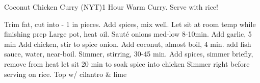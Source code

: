 \documentclass[a6paper,landscape]{article}
\begin{document}
\begin{recipe}{Coconut Chicken Curry        (NYT)}{1 Hour}{}
  \freeform Warm Curry. Serve with rice! 

  Trim fat, cut into  - 1 in pieces. Add spices, mix well. Let sit at room temp while finishing prep
  Large pot, heat oil. Sauté onions med-low 8-10min. Add garlic, 5 min
  Add chicken, stir to spice onion. Add coconut, almost boil, 4 min. add fish sauce, water, near-boil. 
  Simmer, stirring, 30-45 min. Add spices, simmer briefly, remove from heat
  \newstep let sit 20 min to soak spice into chicken
  Simmer right before serving on rice. Top w/ cilantro \& lime
  \end{recipe}
\end{document}
